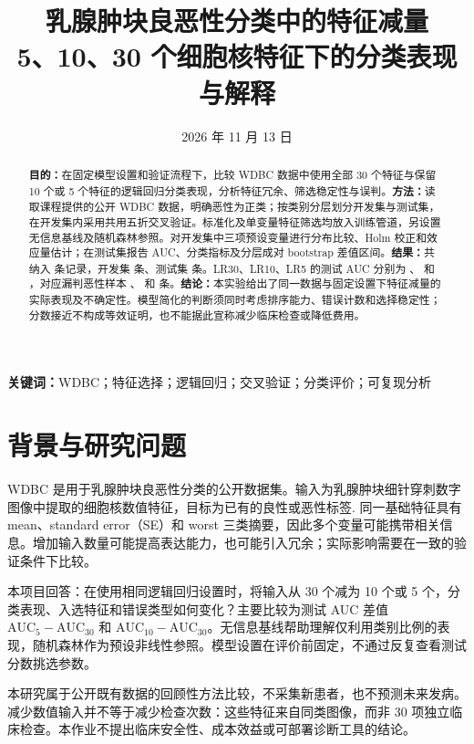 \documentclass[UTF8,fontset=none,zihao=-4]{ctexart}
\title{\vspace{-1em}\heiti 乳腺肿块良恶性分类中的特征减量\\[0.6em]\large 5、10、30 个细胞核特征下的分类表现与解释}
\author{\AuthorName}
\date{2026 年 11 月 13 日}
\begin{document}
\maketitle
\thispagestyle{empty}
\begin{abstract}
\noindent\textbf{目的：}在固定模型设置和验证流程下，比较 WDBC 数据中使用全部 30 个特征与保留 10 个或 5 个特征的逻辑回归分类表现，分析特征冗余、筛选稳定性与误判。\textbf{方法：}读取课程提供的公开 WDBC 数据，明确恶性为正类；按类别分层划分开发集与测试集，在开发集内采用共用五折交叉验证。标准化及单变量特征筛选均放入训练管道，另设置无信息基线及随机森林参照。对开发集中三项预设变量进行分布比较、Holm 校正和效应量估计；在测试集报告 AUC、分类指标及分层成对 bootstrap 差值区间。\textbf{结果：}共纳入 \TotalN{} 条记录，开发集 \DevelopmentN{} 条、测试集 \TestN{} 条。LR30、LR10、LR5 的测试 AUC 分别为 \LRFullAUC{}、\LRTenAUC{} 和 \LRFiveAUC{}，对应漏判恶性样本 \LRFullFN{}、\LRTenFN{} 和 \LRFiveFN{} 条。\textbf{结论：}本实验给出了同一数据与固定设置下特征减量的实际表现及不确定性。模型简化的判断须同时考虑排序能力、错误计数和选择稳定性；分数接近不构成等效证明，也不能据此宣称减少临床检查或降低费用。
\end{abstract}
\noindent\textbf{关键词：}WDBC；特征选择；逻辑回归；交叉验证；分类评价；可复现分析

\vspace{0.6em}
\noindent{}
\newpage

\section{背景与研究问题}
WDBC 是用于乳腺肿块良恶性分类的公开数据集。输入为乳腺肿块细针穿刺数字图像中提取的细胞核数值特征，目标为已有的良性或恶性标签\cite{uci}. 同一基础特征具有 mean、standard error（SE）和 worst 三类摘要，因此多个变量可能携带相关信息。增加输入数量可能提高表达能力，也可能引入冗余；实际影响需要在一致的验证条件下比较。

本项目回答：在使用相同逻辑回归设置时，将输入从 30 个减为 10 个或 5 个，分类表现、入选特征和错误类型如何变化？主要比较为测试 AUC 差值 $\mathrm{AUC}_{5}-\mathrm{AUC}_{30}$ 和 $\mathrm{AUC}_{10}-\mathrm{AUC}_{30}$。无信息基线帮助理解仅利用类别比例的表现，随机森林作为预设非线性参照。模型设置在评价前固定，不通过反复查看测试分数挑选参数。

本研究属于公开既有数据的回顾性方法比较，不采集新患者，也不预测未来发病。减少数值输入并不等于减少检查次数：这些特征来自同类图像，而非 30 项独立临床检查。本作业不提出临床安全性、成本效益或可部署诊断工具的结论。
\end{document}
